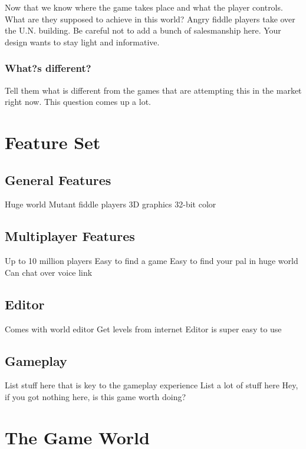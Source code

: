 \documentclass[a4paper]{report}
\begin{document}
			Now that we know where the game takes place and what the player controls.  What are they supposed to achieve in this world?  Angry fiddle players take over the U.N. building.  Be careful not to add a bunch of salesmanship here.  Your design wants to stay light and informative.

		\subsection{What?s different?}

			Tell them what is different from the games that are attempting this in the market right now.  This question comes up a lot.

\chapter{Feature Set}

	\section{General Features}

		Huge world
		Mutant fiddle players
		3D graphics
		32-bit color

	\section{Multiplayer Features}

		Up to 10 million players
		Easy to find a game
		Easy to find your pal in huge world
		Can chat over voice link

	\section{Editor}

		Comes with world editor
		Get levels from internet
		Editor is super easy to use

	\section{Gameplay}

		List stuff here that is key to the gameplay experience
		List a lot of stuff here
		Hey, if you got nothing here, is this game worth doing?

\chapter{The Game World}
\end{document}

